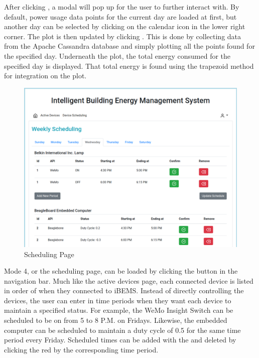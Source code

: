 \documentclass[conference]{IEEEtran}
\begin{document}
After clicking , a modal will pop up for the user to further interact with. By default, power usage data points for the current day are loaded at first, but another day can be selected by clicking on the calendar icon in the lower right corner. The plot is then updated by clicking . This is done by collecting data from the Apache Cassandra database and simply plotting all the points found for the specified day. Underneath the plot, the total energy consumed for the specified day is displayed. That total energy is found using the trapezoid method for integration on the plot.

\begin{figure}[htbp]
    \centering
    \includegraphics[scale=0.2]{figs/webServer/Applications_screen.png}
    \caption{Scheduling Page}
    \label{fig:schedulingl}
\end{figure}

Mode 4, or the scheduling page, can be loaded by clicking the  button in the navigation bar. Much like the active devices page, each connected device is listed in order of when they connected to iBEMS. Instead of directly controlling the devices, the user can enter in time periods when they want each device to maintain a specified status. For example, the WeMo Insight Switch can be scheduled to be on from 5 to 8 P.M. on Fridays. Likewise, the embedded computer can be scheduled to maintain a duty cycle of 0.5 for the same time period every Friday. Scheduled times can be added with the  and deleted by clicking the red  by the corresponding time period.






\end{document}
